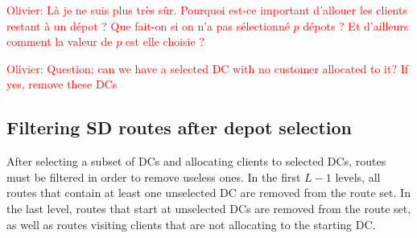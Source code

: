 \documentclass[a4paper,10pt]{article}
\begin{document}
\begin{linenumbers}
\textcolor{red}{Olivier: Là je ne suis plus très sûr. Pourquoi est-ce important d'allouer les clients restant à un dépot ? Que fait-on si on n'a pas sélectionné $p$ dépots ? Et d'ailleurs comment la valeur de $p$ est elle choisie ? }

\textcolor{red}{Olivier: Question: can we have a selected DC with no customer allocated to it? If yes, remove these DCs}


\newpage

\subsection{Filtering SD routes after depot selection}

After selecting a subset of DCs and allocating clients to selected DCs, routes must be filtered in order to remove useless ones. 
In the first $L-1$ levels, all routes that contain at least one unselected DC are removed from the route set. 
In the last level, routes that start at unselected DCs are removed from the route set, as well as routes visiting clients that are not allocating to the starting DC. 


%
%		
%		
%
%
%
%
%		
%				




\end{linenumbers}
\end{document}
